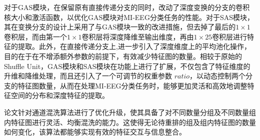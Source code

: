 对于GAS模块，在保留原有直接传递分支的同时，改动了深度变换的分支的卷积核大小和激活函数，以优化GAS模块对MI-EEG分类任务的性能。对于SAS模块，其在变换分支的设计上采用了与GAS模块一致的改进措施，但去掉了最后的\(1\times1\)卷积层，而由第一个\(1\times1\)卷积层将深度降维至输出维度，再由\(1\times25\)卷积层进行特征的提取。此外，在直接传递分支上,进一步引入了深度维度上的平均池化操作，目的在于在不增添额外参数的前提下，有效减少特征图的数量。相较于原始的Shuffle Unit，GAS模块和SAS模块在功能上进行了扩展，不仅包含了特征维度的升维和降维处理，而且还引入了一个可调节的权重参数 \(ratio\)，以动态控制两个分支的特征图数量，从而在处理MI-EEG分类任务时，能够更加灵活和高效地调整特征空间的分布和深度特征的提取。

论文针对通道混洗算法进行了优化升级，使其具备了对不同数量分组及不同数量组内特征图进行灵活、均衡混洗的能力。这使得无论待重排的组及组内特征图的数量如何变化，该算法都能够实现有效的特征交互与信息整合。
